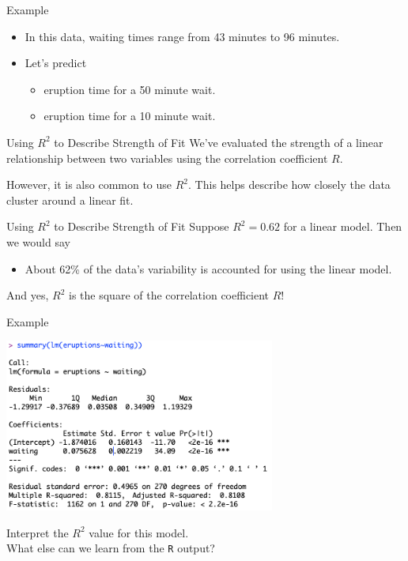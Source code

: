 \begin{frame}{Example}
    \begin{itemize}
        \item In this data, waiting times range from 43 minutes to 96 minutes. 
        \item Let's predict
        \begin{itemize}
            \item eruption time for a 50 minute wait.
            \item eruption time for a 10 minute wait.
        \end{itemize}
    \end{itemize}
\end{frame}

\begin{frame}{Using $R^2$ to Describe Strength of Fit}
    We've evaluated the strength of a linear relationship between two variables using the correlation coefficient $R$.
    
    \vspace{12pt}However, it is also common to use $R^2$. This helps describe how closely the data cluster around a linear fit.
\end{frame}

\begin{frame}{Using $R^2$ to Describe Strength of Fit}
    Suppose $R^2 = 0.62$ for a linear model. Then we would say
    \begin{itemize}
        \item About 62\% of the data's variability is accounted for using the linear model. 
    \end{itemize}
    And yes, $R^2$ is the square of the correlation coefficient $R$!
\end{frame}

\begin{frame}{Example}
    \begin{center}
        \includegraphics[width=3.5in]{images/geyserout.png}
    \end{center}
    Interpret the $R^2$ value for this model. \\What else can we learn from the \texttt{R} output?
\end{frame}

